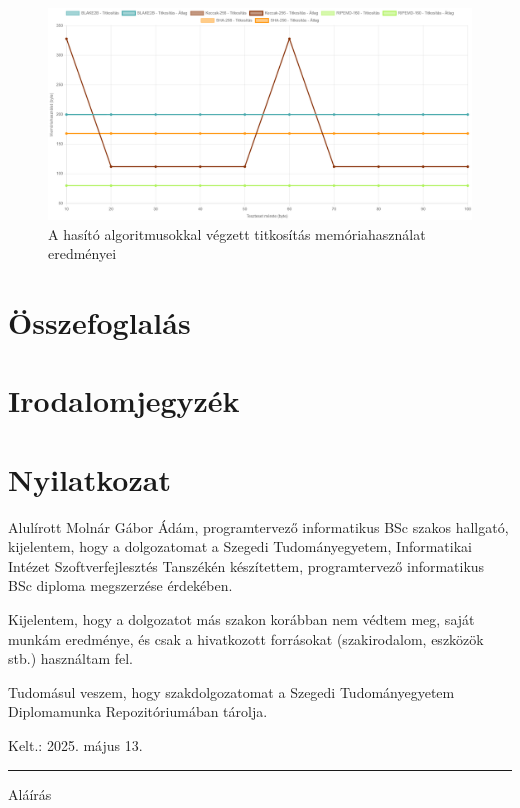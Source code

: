 \documentclass[12pt]{report} %
\begin{document}
\begin{figure}[H]
    \centering %
    \includegraphics[width=\textwidth]{Figures/HashingEncryptionMemoryUsage.png} %
    \caption{A hasító algoritmusokkal végzett titkosítás memóriahasználat eredményei} %
    \label{fig:HashingEncryptionMemoryUsage} %
\end{figure}

\chapter{Összefoglalás} %

\chapter*{Irodalomjegyzék} %

\printbibliography[heading=none] %

\chapter*{Nyilatkozat} %

Alulírott Molnár Gábor Ádám, programtervező informatikus BSc szakos hallgató, kijelentem, hogy a dolgozatomat a Szegedi Tudományegyetem, Informatikai Intézet Szoftverfejlesztés Tanszékén készítettem, programtervező informatikus BSc diploma megszerzése érdekében.

Kijelentem, hogy a dolgozatot más szakon korábban nem védtem meg, saját munkám eredménye, és csak a hivatkozott forrásokat (szakirodalom, eszközök stb.) használtam fel.

Tudomásul veszem, hogy szakdolgozatomat a Szegedi Tudományegyetem Diplomamunka Repozitóriumában tárolja.

\vspace{1cm}

{\large Kelt.: 2025. május 13.}

\vspace{0.5cm}
\hfill
\parbox{5cm}{\centering\hrule\vspace{0.3cm} Aláírás}
\end{document}
